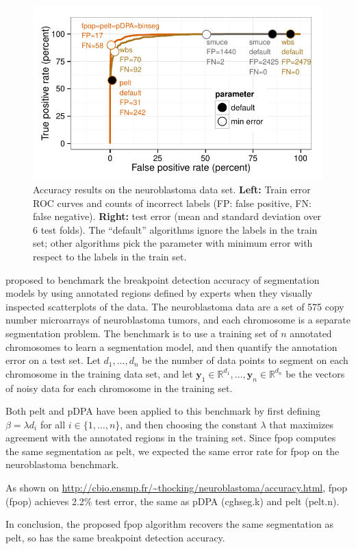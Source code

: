 \documentclass{article}
\newcommand{\RR}{\mathbb R}
\begin{document}
\begin{figure}
  \centering
  \parbox{3.5in}{
    \includegraphics[width=\linewidth]{figure-neuroblastoma-roc}
  }
  \parbox{3in}{
    
  }
  \caption{Accuracy results on the neuroblastoma data set.
    \textbf{Left:} 
    Train error ROC curves and counts of incorrect labels
    (FP: false positive, FN: false negative).
    \textbf{Right:} 
    test error (mean and standard deviation over 6 test folds). 
    The ``default'' algorithms ignore the labels in the train set; 
    other algorithms pick the parameter with minimum error with respect
    to the labels in the train set.}
  \label{tab:neuroblastoma-test-error}
\end{figure}

\citet{HOCKING-breakpoints} proposed to benchmark the breakpoint
detection accuracy of segmentation models by using annotated regions
defined by experts when they visually inspected scatterplots of the
data. The neuroblastoma data are a set of 575 copy number microarrays
of neuroblastoma tumors, and each chromosome is a separate
segmentation problem. The benchmark is to use a training set of $n$
annotated chromosomes to learn a segmentation model, and then quantify
the annotation error on a test set. Let $d_1, \dots, d_n$ be the
number of data points to segment on each chromosome in the training
data set, and let $\mathbf y_1\in\RR^{d_1}, \dots, \mathbf
y_n\in\RR^{d_n}$ be the vectors of noisy data for each chromosome in
the training set.

Both pelt and pDPA have been applied to this benchmark by first
defining $\beta = \lambda d_i$ for all $i\in\{1, \dots, n\}$, and then
choosing the constant $\lambda$ that maximizes agreement with the
annotated regions in the training set. Since fpop computes the same
segmentation as pelt, we expected the same error rate for
fpop on the neuroblastoma benchmark.

As shown on
\url{http://cbio.ensmp.fr/~thocking/neuroblastoma/accuracy.html}, fpop
(fpop) achieves 2.2\% test error, the same as pDPA (cghseg.k) and pelt
(pelt.n).

In conclusion, the proposed fpop algorithm recovers the same
segmentation as pelt, so has the same breakpoint detection
accuracy.





\end{document}
